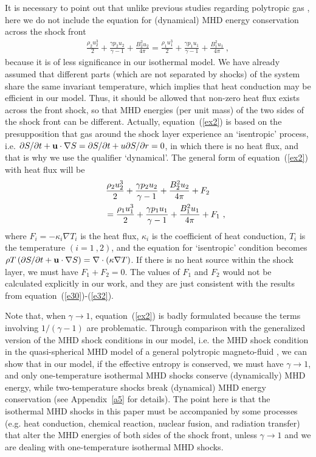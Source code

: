 \documentclass[fleqn,usenatbib]{mnras}
\begin{document}
It is necessary to point out that unlike previous studies regarding polytropic gas \citep{lou2006self,wang2008dynamic},  here we do not include the equation for (dynamical) MHD energy conservation across the shock front 
\begin{gather}
\frac{\rho_{2} u_{2}^{3}}{2}+\frac{\gamma p_{2} u_{2}}{\gamma-1}+\frac{B_{2}^{2}u_{2}}{4\pi}=\frac{\rho_{1} u_{1}^{3}}{2}+\frac{\gamma p_{1} u_{1}}{\gamma-1}+\frac{B_{1}^{2}u_{1}}{4\pi}\ ,\label{ex2}
\end{gather}
because it is of less significance in our isothermal model. We have already assumed that different parts (which are not separated by shocks) of the system share the same invariant temperature, which implies that heat conduction may be efficient in our model. Thus, it should be allowed that non-zero heat flux exists across the front shock, so that MHD energies (per unit mass) of the two sides of the shock front can be different. Actually, equation~(\ref{ex2}) is based on the presupposition that gas around the shock layer experience an `isentropic' process, i.e. $\partial S/\partial t+{\bf{u}} \cdot\nabla S=\partial S/\partial t+u\partial S/\partial r=0$, in which there is no heat flux, and that is why we use the qualifier `dynamical'. The general form of equation~(\ref{ex2}) with heat flux will be 
\begin{gather}
\frac{\rho_{2} u_{2}^{3}}{2}+\frac{\gamma p_{2} u_{2}}{\gamma-1}+\frac{B_{2}^{2}u_{2}}{4\pi}+F_{2}\notag\\
\qquad=\frac{\rho_{1} u_{1}^{3}}{2}+\frac{\gamma p_{1} u_{1}}{\gamma-1}+\frac{B_{1}^{2}u_{1}}{4\pi}+F_{1}\ ,\label{ex4} 
\end{gather}
where $F_{i}=-\kappa_{i} \nabla T_{i}$ is the heat flux, $\kappa_{i}$ is the coefficient of heat conduction, $T_{i}$ is the temperature $(i=1\ ,2)$, and the equation for `isentropic' condition becomes $\rho T\left(\partial S/\partial t+{\bf{u}} \cdot\nabla S\right)=\nabla\cdot \left(\kappa\nabla T\right)$. If there is no heat source within the shock layer, we must have $F_{1}+F_{2}=0$. The values of $F_{1}$ and $F_{2}$ would not be calculated explicitly in our work, and they are just consistent with the results from equation~(\ref{e30})-(\ref{e32}).

Note that, when $\gamma\rightarrow 1$, equation~(\ref{ex2}) is badly formulated because the terms involving $1/(\gamma-1)$ are problematic. Through comparison with the generalized version of the MHD shock conditions in our model, i.e. the MHD shock condition in the quasi-spherical MHD model of a general polytropic magneto-fluid \citep{wang2008dynamic}, we can show that in our model, if the effective entropy is conserved, we must have $\gamma\rightarrow 1$, and only one-temperature isothermal MHD shocks conserve (dynamically) MHD energy, while two-temperature shocks break (dynamical) MHD energy conservation (see Appendix~\ref{a5} for details). The point here is that the isothermal MHD shocks in this paper must be accompanied by some processes (e.g. heat conduction, chemical reaction, nuclear fusion, and radiation transfer) that alter the MHD energies of both sides of the shock front, unless $\gamma\rightarrow 1$ and we are dealing with one-temperature isothermal MHD shocks.
\end{document}
